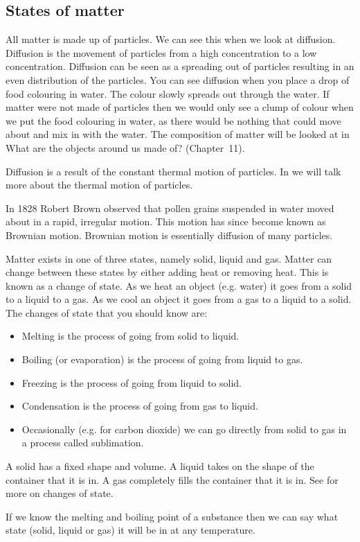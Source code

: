             \subsection{ States of matter}
            \nopagebreak
\label{m38736*id324876121}All matter is made up of particles. We can see this when we look at diffusion. Diffusion is the movement of particles from a high concentration to a low concentration. Diffusion can be seen as a spreading out of particles resulting in an even distribution of the particles. You can see diffusion when you place a drop of food colouring in water. The colour slowly spreads out through the water. If matter were not made of particles then we would only see a clump of colour when we put the food colouring in water, as there would be nothing that could move about and mix in with the water. The composition of matter will be looked at in What are the objects around us made of? (Chapter~11). 
\par 
\label{m38736*id10987324}Diffusion is a result of the constant thermal motion of particles. In  we will talk more about the thermal motion of particles. 
\par 
\label{m38736*id0128031}In 1828 Robert Brown observed that pollen grains suspended in water moved about in a rapid, irregular motion. This motion has since become known as Brownian motion. Brownian motion is essentially diffusion of many particles.
\par 
\label{m38736*id48327}Matter exists in one of three states, namely solid, liquid and gas. Matter can change between these states by either adding heat or removing heat. This is known as a change of state. As we heat an object (e.g. water) it goes from a solid to a liquid to a gas. As we cool an object it goes from a gas to a liquid to a solid.
The changes of state that you should know are:
\label{m38736*id02341}\begin{itemize}[noitemsep]
            \item 
 Melting is the process of going from solid to liquid.\item  Boiling (or evaporation) is the process of going from liquid to gas.\item  Freezing is the process of going from liquid to solid.\item  Condensation is the process of going from gas to liquid.\item  Occasionally (e.g. for carbon dioxide) we can go directly from solid to gas in a process called sublimation.\end{itemize}
         A solid has a fixed shape and volume. A liquid takes on the shape of the container that it is in. A gas completely fills the container that it is in. See  for more on changes of state.
\par \label{m38736*eip-957}If we know the melting and boiling point of a substance then we can say what state (solid, liquid or gas) it will be in at any temperature. \par \label{m38736*eip-232}
